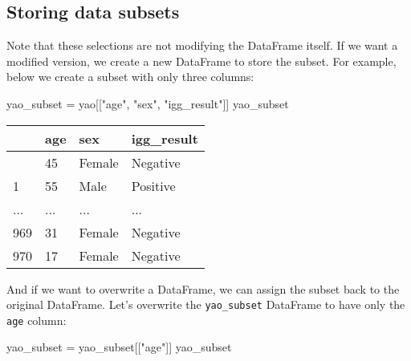 \documentclass[
  letterpaper,
  DIV=11,
  numbers=noendperiod]{scrreprt}
\newenvironment{Shaded}{\begin{snugshade}}{\end{snugshade}}
\newcommand{\NormalTok}[1]{\textcolor[rgb]{0.00,0.23,0.31}{#1}}
\newcommand{\OperatorTok}[1]{\textcolor[rgb]{0.37,0.37,0.37}{#1}}
\newcommand{\StringTok}[1]{\textcolor[rgb]{0.13,0.47,0.30}{#1}}
\begin{document}
\begin{tcolorbox}[enhanced jigsaw, colframe=quarto-callout-note-color-frame, opacityback=0, titlerule=0mm, bottomrule=.15mm, breakable, leftrule=.75mm, colbacktitle=quarto-callout-note-color!10!white, title=\textcolor{quarto-callout-note-color}{\faInfo}\hspace{0.5em}{Key Point}, rightrule=.15mm, coltitle=black, opacitybacktitle=0.6, colback=white, left=2mm, arc=.35mm, toptitle=1mm, bottomtitle=1mm, toprule=.15mm]

\section{Storing data subsets}\label{storing-data-subsets}

Note that these selections are not modifying the DataFrame itself. If we
want a modified version, we create a new DataFrame to store the subset.
For example, below we create a subset with only three columns:

\begin{Shaded}
\begin{Highlighting}[]
\NormalTok{yao\_subset }\OperatorTok{=}\NormalTok{ yao[[}\StringTok{"age"}\NormalTok{, }\StringTok{"sex"}\NormalTok{, }\StringTok{"igg\_result"}\NormalTok{]]}
\NormalTok{yao\_subset}
\end{Highlighting}
\end{Shaded}

\begin{longtable}[]{@{}llll@{}}
\toprule\noalign{}
& age & sex & igg\_result \\
\midrule\noalign{}
\endhead
\bottomrule\noalign{}
\endlastfoot
0 & 45 & Female & Negative \\
1 & 55 & Male & Positive \\
... & ... & ... & ... \\
969 & 31 & Female & Negative \\
970 & 17 & Female & Negative \\
\end{longtable}

And if we want to overwrite a DataFrame, we can assign the subset back
to the original DataFrame. Let's overwrite the \texttt{yao\_subset}
DataFrame to have only the \texttt{age} column:

\begin{Shaded}
\begin{Highlighting}[]
\NormalTok{yao\_subset }\OperatorTok{=}\NormalTok{ yao\_subset[[}\StringTok{"age"}\NormalTok{]]}
\NormalTok{yao\_subset}
\end{Highlighting}
\end{Shaded}


\end{tcolorbox}
\end{document}

